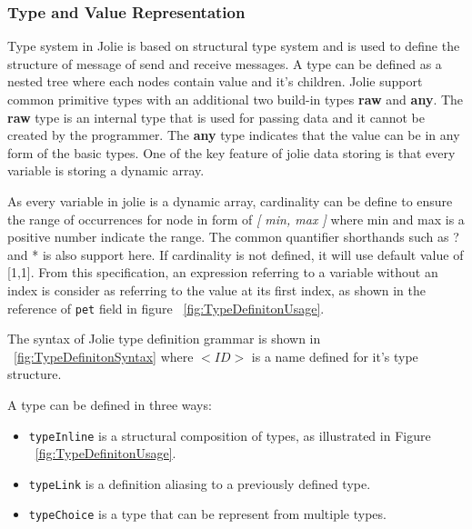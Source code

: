 \subsubsection{Type and Value Representation}
\label{sec:jolie-type-def}

Type system in Jolie is based on structural type system and is used to define the structure of message of send and receive messages. A type can be defined as a nested tree where each nodes contain value and it's children. Jolie support common primitive types with an additional two build-in types \textbf{raw} and \textbf{any}. The \textbf{raw} type is an internal type that is used for passing data and it cannot be created by the programmer. The \textbf{any} type indicates that the value can be in any form of the basic types. One of the key feature of jolie data storing is that every variable is storing a dynamic array.

As every variable in jolie is a dynamic array, cardinality can be define to ensure the range of occurrences for node in form of \textit{[ min, max ]} where min and max is a positive number indicate the range. The common quantifier shorthands such as ? and * is also support here. If cardinality is not defined, it will use default value of [1,1]. From this specification, an expression referring to a variable without an index is consider as referring to the value at its first index, as shown in the reference of \texttt{pet} field in figure ~\ref{fig:TypeDefinitonUsage}. 

The syntax of Jolie type definition grammar is shown in ~\ref{fig:TypeDefinitonSyntax} where \(<ID>\) is a name defined for it's type structure.

A type can be defined in three ways:
\begin{itemize}
	\item \texttt{typeInline} is a structural composition of types, as illustrated in Figure ~\ref{fig:TypeDefinitonUsage}.
	\item \texttt{typeLink} is a definition aliasing to a previously defined type.
	\item \texttt{typeChoice} is a type that can be represent from multiple types.
\end{itemize}

